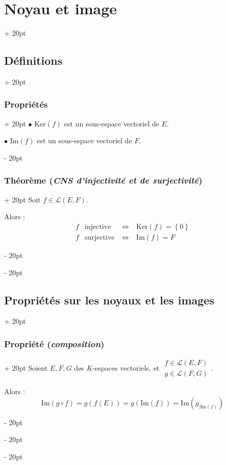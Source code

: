 \documentclass[a4paper, 12pt, twoside]{article}
\newcommand{\lr}[1]{\left( #1 \right)}
\newcommand{\set}[1]{\left\{ #1 \right\}}
\newcommand{\ssi}{\ \Leftrightarrow \ }
\newcommand{\ind}[1][20pt]{\advance\leftskip + #1}
\newcommand{\deind}[1][20pt]{\advance\leftskip - #1}
\newenvironment{indt}[2][20pt]{#2 \par \ind[#1]}{\par \deind} %
\begin{document}
\begin{indt}{\section{Noyau et image}}
\begin{indt}{\subsection{Définitions}}
\begin{indt}{\subsubsection{Propriétés}}
                $\bullet$ $\mathrm{Ker}(f)$ est un sous-espace vectoriel de $E$.

                $\bullet$ $\mathrm{Im}(f)$ est un sous-espace vectoriel de $F$.
            \end{indt}

            \vspace{12pt}
            
            \begin{indt}{\subsubsection{Théorème (\textit{CNS d'injectivité et de surjectivité})}}
                Soit $f \in \mathcal L(E, F)$.

                Alors :
                \[
                    \begin{array}{clcl}
                        f & \text{injective} & \ssi & \mathrm{Ker}(f) = \set 0
                        \\
                        f & \text{surjective} & \ssi & \mathrm{Im}(f) = F
                    \end{array}
                \]
            \end{indt}
        \end{indt}

        \vspace{12pt}
        
        \begin{indt}{\subsection{Propriétés sur les noyaux et les images}}
            \begin{indt}{\subsubsection{Propriété (\textit{composition})}}
                Soient $E, F, G$ des $K$-espaces vectoriels, et
                $
                    \begin{array}{|l}
                        f \in \mathcal L(E, F)
                        \\
                        g \in \mathcal L(F, G)
                    \end{array}
                $.

                Alors :
                \[
                    \mathrm{Im}(g \circ f)
                    = g\!\lr{f(E)}
                    = g\!\lr{\mathrm{Im}(f)}
                    = \mathrm{Im}\!\lr{g_{| \mathrm{Im}(f)}}
                \]
            \end{indt}


\end{indt}
\end{indt}
\end{document}
